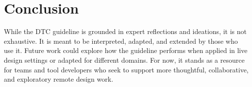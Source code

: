 \documentclass[11pt]{article}
\begin{document}
\section{Conclusion}

While the DTC guideline is grounded in expert reflections and ideations, it is not exhaustive. It is meant to be interpreted, adapted, and extended by those who use it. Future work could explore how the guideline performs when applied in live design settings or adapted for different domains. For now, it stands as a resource for teams and tool developers who seek to support more thoughtful, collaborative, and exploratory remote design work.

\newpage


\end{document}

